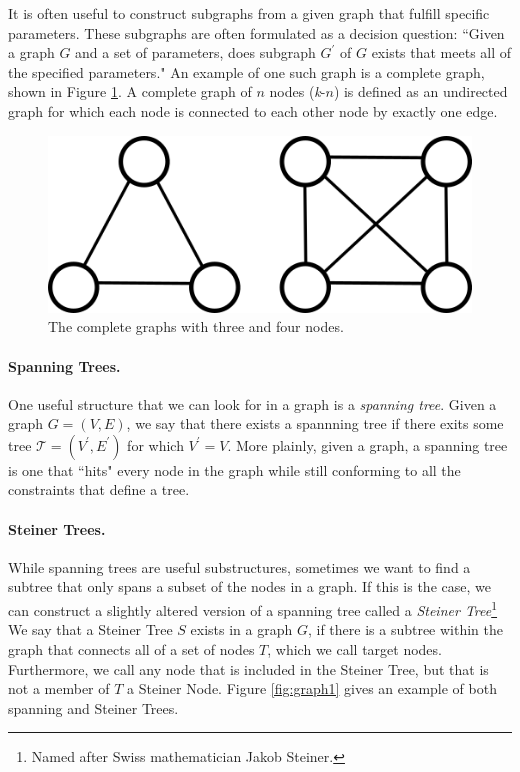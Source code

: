\documentclass[12pt,twoside]{reedthesis}
\theoremstyle{definition}
\begin{document}
   It is often useful to construct subgraphs from a given graph that fulfill specific parameters. These subgraphs are often formulated as a decision question: ``Given a graph $G$ and a set of parameters, does subgraph $G^\prime$ of $G$ exists that meets all of the specified parameters." An example of one such graph is a complete graph, shown in Figure \ref{fig:complete_graphs}. A complete graph of $n$ nodes (\textit{k}-$n$) is defined as an undirected graph for which each node is connected to each other node by exactly one edge.

   \begin{figure}[!h]
     \begin{center}
       \includegraphics[width=\textwidth/2]{complete_graphs}
     \caption[Complete Graphs \textit{k}-3 and \textit{k}-4.]{The complete graphs with three and four nodes.}
     \label{fig:complete_graphs}
     \end{center}
   \end{figure}

   \paragraph{Spanning Trees.}One useful structure that we can look for in a graph is a \textit{spanning tree}. Given a graph $G=(V,E)$, we say that there exists a spannning tree if there exits some tree $\mathcal{T}=(V^\prime,E^\prime)$ for which $V^\prime = V$.  More plainly, given a graph, a spanning tree is one that ``hits" every node in the graph while still conforming to all the constraints that define a tree.

   \paragraph{Steiner Trees.}While spanning trees are useful substructures, sometimes we want to find a subtree that only spans a subset of the nodes in a graph. If this is the case, we can construct a slightly altered version of a spanning tree called a \textit{Steiner Tree}\footnote{Named after Swiss mathematician Jakob Steiner.} We say that a Steiner Tree $S$ exists in a graph $G$, if there is a subtree within the graph that connects all of a set of nodes $T$, which we call target nodes. Furthermore, we call any node that is included in the Steiner Tree, but that is not a member of $T$ a Steiner Node. Figure \ref{fig:graph1} gives an example of both spanning and Steiner Trees.
\end{document}
